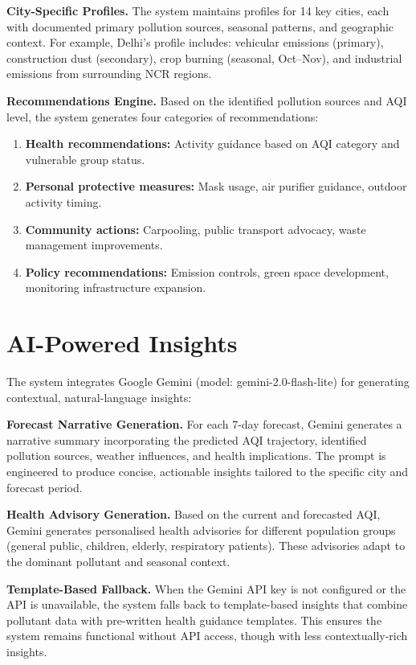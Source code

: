 \documentclass[12pt,a4paper]{report}
\begin{document}
\textbf{City-Specific Profiles.} The system maintains profiles for 14 key cities, each with documented primary pollution sources, seasonal patterns, and geographic context. For example, Delhi's profile includes: vehicular emissions (primary), construction dust (secondary), crop burning (seasonal, Oct--Nov), and industrial emissions from surrounding NCR regions.

\textbf{Recommendations Engine.} Based on the identified pollution sources and AQI level, the system generates four categories of recommendations:
\begin{enumerate}
    \item \textbf{Health recommendations:} Activity guidance based on AQI category and vulnerable group status.
    \item \textbf{Personal protective measures:} Mask usage, air purifier guidance, outdoor activity timing.
    \item \textbf{Community actions:} Carpooling, public transport advocacy, waste management improvements.
    \item \textbf{Policy recommendations:} Emission controls, green space development, monitoring infrastructure expansion.
\end{enumerate}

\section{AI-Powered Insights}

The system integrates Google Gemini (model: gemini-2.0-flash-lite) for generating contextual, natural-language insights:

\textbf{Forecast Narrative Generation.} For each 7-day forecast, Gemini generates a narrative summary incorporating the predicted AQI trajectory, identified pollution sources, weather influences, and health implications. The prompt is engineered to produce concise, actionable insights tailored to the specific city and forecast period.

\textbf{Health Advisory Generation.} Based on the current and forecasted AQI, Gemini generates personalised health advisories for different population groups (general public, children, elderly, respiratory patients). These advisories adapt to the dominant pollutant and seasonal context.

\textbf{Template-Based Fallback.} When the Gemini API key is not configured or the API is unavailable, the system falls back to template-based insights that combine pollutant data with pre-written health guidance templates. This ensures the system remains functional without API access, though with less contextually-rich insights.
\end{document}
